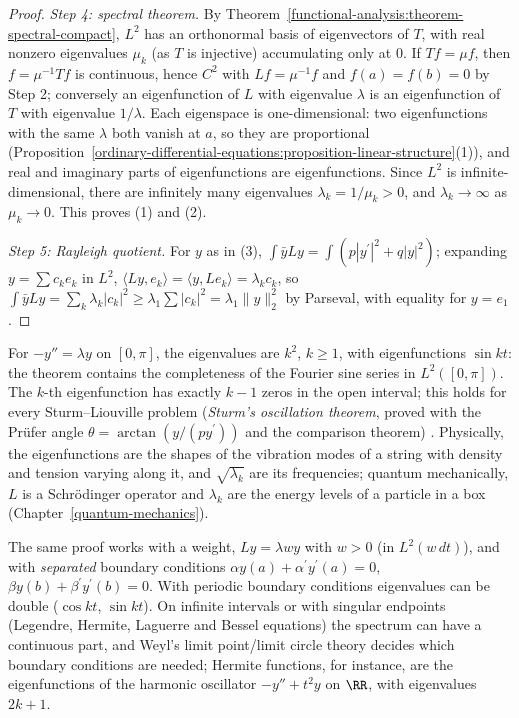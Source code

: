 \begin{proof}
\emph{Step 4: spectral theorem.} By Theorem~\ref{functional-analysis:theorem-spectral-compact}, $L^2$ has an orthonormal basis of eigenvectors of $T$, with real nonzero eigenvalues $\mu_k$ (as $T$ is injective) accumulating only at $0$. If
$Tf = \mu f$, then $f = \mu^{-1}Tf$ is continuous, hence $C^2$ with $Lf = \mu^{-1}f$ and $f(a) = f(b) = 0$ by Step 2; conversely an eigenfunction of $L$ with eigenvalue $\lambda$ is an eigenfunction of $T$ with eigenvalue $1/\lambda$. Each
eigenspace is one-dimensional: two eigenfunctions with the same $\lambda$ both vanish at $a$, so they are proportional (Proposition~\ref{ordinary-differential-equations:proposition-linear-structure}(1)), and real and imaginary parts of
eigenfunctions are eigenfunctions. Since $L^2$ is infinite-dimensional, there are infinitely many eigenvalues $\lambda_k = 1/\mu_k > 0$, and $\lambda_k \to \infty$ as $\mu_k \to 0$. This proves (1) and (2).

\emph{Step 5: Rayleigh quotient.} For $y$ as in (3), $\int\bar yLy = \int(p|y^{\prime}|^2 + q|y|^2)$; expanding $y = \sum c_ke_k$ in $L^2$, $\langle Ly, e_k\rangle = \langle y, Le_k\rangle = \lambda_k c_k$, so
$\int\bar yLy = \sum_k\lambda_k|c_k|^2 \geq \lambda_1\sum|c_k|^2 = \lambda_1\|y\|_2^2$ by Parseval, with equality for $y = e_1$.
\end{proof}

\begin{example}\label{ordinary-differential-equations:example-sturm-liouville}
For $-y'' = \lambda y$ on $[0, \pi]$, the eigenvalues are $k^2$, $k \geq 1$, with eigenfunctions $\sin kt$: the theorem contains the completeness of the Fourier sine series in $L^2([0, \pi])$. The $k$-th eigenfunction has exactly
$k - 1$ zeros in the open interval; this holds for every Sturm--Liouville problem (\emph{Sturm's oscillation theorem}, proved with the Pr\"ufer angle $\theta = \arctan(y/(py^{\prime}))$ and the comparison theorem)
\cite[Chapter 8]{coddington-levinson}. Physically, the eigenfunctions are the shapes of the vibration modes of a string with density and tension varying along it, and $\sqrt{\lambda_k}$ are its frequencies; quantum mechanically, $L$
is a Schr\"odinger operator and $\lambda_k$ are the energy levels of a particle in a box (Chapter~\ref{quantum-mechanics}).
\end{example}

\begin{remark}\label{ordinary-differential-equations:remark-sturm-liouville-general}
The same proof works with a weight, $Ly = \lambda wy$ with $w > 0$ (in $L^2(w\,dt)$), and with \emph{separated} boundary conditions $\alpha y(a) + \alpha^{\prime}y^{\prime}(a) = 0$, $\beta y(b) + \beta^{\prime}y^{\prime}(b) = 0$. With periodic boundary conditions
eigenvalues can be double ($\cos kt$, $\sin kt$). On infinite intervals or with singular endpoints (Legendre, Hermite, Laguerre and Bessel equations) the spectrum can have a continuous part, and Weyl's limit point/limit circle theory
decides which boundary conditions are needed; Hermite functions, for instance, are the eigenfunctions of the harmonic oscillator $-y'' + t^2y$ on $\RR$, with eigenvalues $2k + 1$.
\end{remark}

